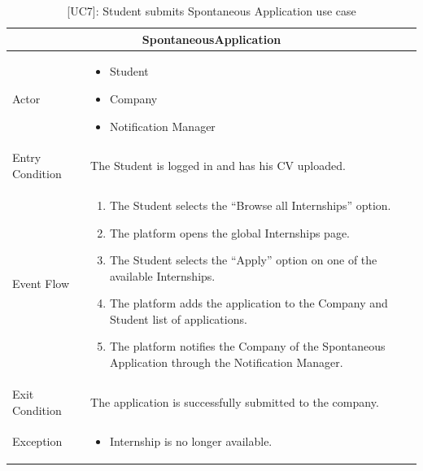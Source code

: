 \begin{table}[H]
    \centering
    \begin{tabular}{|p{3cm}|p{12cm}|}
    \hline
    \multicolumn{2}{|c|}{\textbf{SpontaneousApplication}} \\ \hline
    Actor & 
    \begin{itemize}
        \item Student
        \item Company
        \item Notification Manager
    \end{itemize}\\ \hline
    Entry Condition & The Student is logged in and has his CV uploaded. \\ \hline
    Event Flow &
    \begin{enumerate}         
        \item The Student selects the “Browse all Internships” option.
        \item The platform opens the global Internships page.
        \item The Student selects the “Apply” option on one of the available Internships.
        \item The platform adds the application to the Company and Student list of applications.
        \item The platform notifies the Company of the Spontaneous Application through the Notification Manager.
    \end{enumerate} \\ \hline
    Exit Condition & The application is successfully submitted to the company.\\ \hline
    Exception & 
    \begin{itemize}       
        \item Internship is no longer available.
    \end{itemize} \\ \hline
    \end{tabular}
    \caption{[UC7]: Student submits Spontaneous Application use case}
    \label{tab:UC7}
\end{table}

